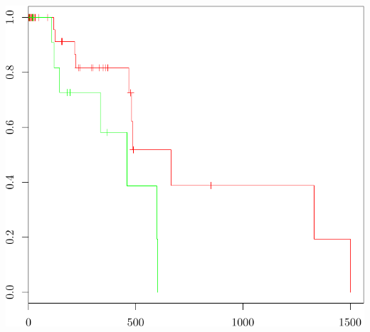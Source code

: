 \documentclass{article}\usepackage[]{graphicx}\usepackage[]{color}
\makeatletter
\def\maxwidth{ %
  \ifdim\Gin@nat@width>\linewidth
    \linewidth
  \else
    \Gin@nat@width
  \fi
}
\newenvironment{knitrout}{}{} %
\makeatother
\begin{document}
\begin{knitrout}
{\centering \includegraphics[width=\maxwidth]{figure/07-E3-E3-val-example-1} 

}



\end{knitrout}
\end{document}
